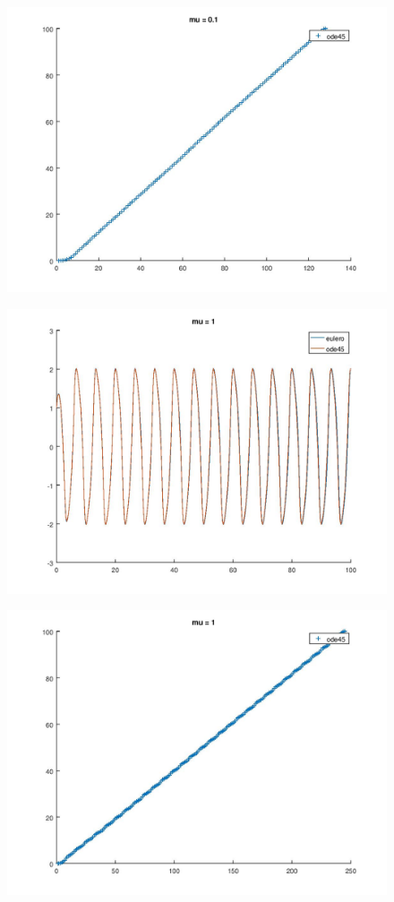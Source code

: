 \documentclass{article}
\begin{document}
	\begin{figure}[htp!]
		\centering 
		\includegraphics[width=\textwidth]{6_3_1_a.jpeg}
	\end{figure}
	\begin{figure}[htp!]
		\centering 
		\includegraphics[width=\textwidth]{6_3_2.jpeg}
	\end{figure}
	\begin{figure}[htp!]
		\centering 
		\includegraphics[width=\textwidth]{6_3_2_a.jpeg}
	\end{figure}
\end{document}
